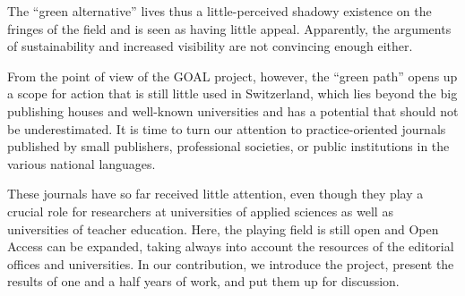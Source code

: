 The \enquote{green alternative} lives thus a little-perceived
shadowy existence on the fringes of the field and is seen as having
little appeal. Apparently, the arguments of sustainability and increased
visibility are not convincing enough either. 

From the point of view of
the GOAL project, however, the \enquote{green path} opens up a scope for
action that is still little used in Switzerland, which lies beyond the
big publishing houses and well-known universities and has a potential
that should not be underestimated. It is time to turn our attention to
practice-oriented journals published by small publishers, professional
societies, or public institutions in the various national languages.

These journals have so far received little attention, even though they
play a crucial role for researchers at universities of applied sciences
as well as universities of teacher education. Here, the playing field is
still open and Open Access can be expanded, taking always into account
the resources of the editorial offices and universities. In our
contribution, we introduce the project, present the results of one and a
half years of work, and put them up for discussion.
